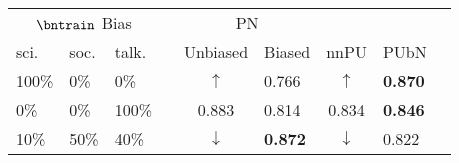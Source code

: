 \begin{tabular}{@{}lllllllll@{}}
  \toprule
  \multicolumn{3}{c}{$\bntrain$ Bias} &    & \multicolumn{2}{c}{PN} &       &      \\\cmidrule{1-3}\cmidrule{5-6}
  sci.   & soc.   & talk.       &    & Unbiased                          & Biased          & nnPU                             & PUbN \\\midrule
  100\%  & 0\%    & 0\%         &    & \multicolumn{1}{c}{$\uparrow$}    & 0.766           & \multicolumn{1}{c}{$\uparrow$}   & \textbf{0.870}\\
  0\%    & 0\%    & 100\%       &    & \multicolumn{1}{c}{0.883}         & 0.814           & \multicolumn{1}{c}{0.834}        & \textbf{0.846} \\
  10\%   & 50\%   & 40\%        &    & \multicolumn{1}{c}{$\downarrow$}  & \textbf{0.872}  & \multicolumn{1}{c}{$\downarrow$} & 0.822 \\
  \bottomrule
\end{tabular}
